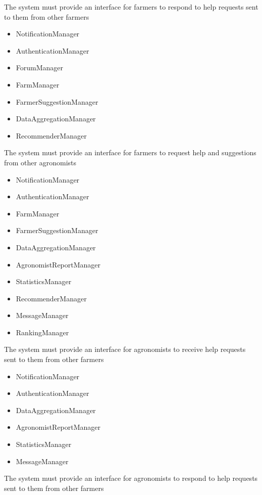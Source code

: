 \begin{itemize}
\begin{itemize}
\end{itemize}

 The system must provide an interface for farmers to respond to help requests sent to them from other farmers

\begin{itemize}

\item NotificationManager
\item AuthenticationManager
\item ForumManager
\item FarmManager
\item FarmerSuggestionManager
\item DataAggregationManager
\item RecommenderManager

\end{itemize}

 The system must provide an interface for farmers to request help and suggestions from other agronomists
\begin{itemize}

\item NotificationManager
\item AuthenticationManager
\item FarmManager
\item FarmerSuggestionManager
\item DataAggregationManager
\item AgronomistReportManager
\item StatisticsManager
\item RecommenderManager
\item MessageManager
\item RankingManager

\end{itemize}

 The system must provide an interface for agronomists to receive help requests sent to them from other farmers
\begin{itemize}

\item NotificationManager
\item AuthenticationManager
\item DataAggregationManager
\item AgronomistReportManager
\item StatisticsManager
\item MessageManager

\end{itemize}
 The system must provide an interface for agronomists to respond to help requests sent to them from other farmers 
\begin{itemize}


\end{itemize}
\end{itemize}
